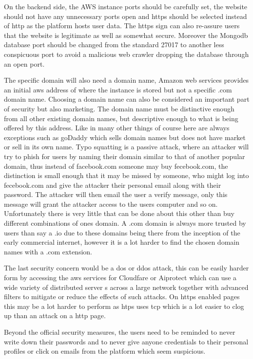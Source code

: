 \documentclass{article}
\begin{document}
On the backend side, the AWS instance ports should be carefully set, the website should not have any unnecessary ports open and https should be selected instead of http as the platform hosts user data. The https sign can also re-assure users that the website is legitimate as well as somewhat secure. Moreover the Mongodb database port should be changed from the standard 27017 to another less conspicuous port to avoid a malicious web crawler dropping the database through an open port. 

The specific domain will also need a domain name, Amazon web services provides an initial aws address of where the instance is stored but not a specific .com domain name. Choosing  a domain name can also be considered an important part of security but also marketing. The domain name must be distinctive enough from all other existing domain names, but descriptive enough to what is being offered by this address. Like in many other things of course here are always exceptions such as goDaddy which sells domain names but does not have market or sell in its own name. 
Typo squatting is a passive attack, where an attacker will try to phish for users by naming their domain similar to that of another popular domain, thus instead of facebook.com someone may buy fecebook.com, the distinction is small enough that it may be missed by someone, who might log into fecebook.com and give the attacker their personal email along with their password. The attacker will then email the user a verify message, only this message will grant the attacker access to the users computer and so on. Unfortunately there is very little that can be done about this other than buy different combinations of ones domain. A .com domain is always more trusted by users than say a .io due to these domains being there from the inception of the early commercial internet, however it is a lot harder to find the chosen domain names with a .com extension.

The last security concern would be a dos or ddos attack, this can be easily harder form by accessing the aws services for Cloudfare or Aiprotect which can use a wide variety of distributed server s across a large network together with advanced filters to mitigate or reduce the effects of such attacks. On https enabled pages this may be a lot harder to perform as htps uses tcp which is a lot easier to clog up than an attack on a http page.



Beyond the official security measures, the users need to be reminded to never write down their passwords and to never give anyone credentials to their personal profiles or click on emails from the platform which seem suspicious.






\cleardoublepage


\end{document}
